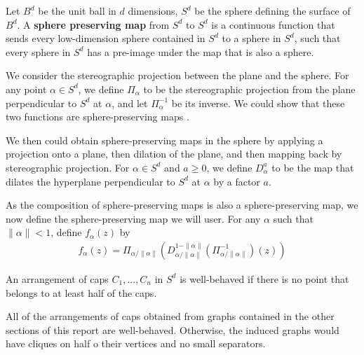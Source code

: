 
\begin{definition}
    Let $B^d$ be the unit ball in $d$ dimensions, $S^d$ be the sphere defining the surface of $B^d$.
    A \textbf{sphere preserving map} from $S^d$ to $S^d$ is a continuous function that sends every low-dimension sphere contained in $S^d$ to a sphere in $S^d$, such that every sphere in $S^d$ has a pre-image under the map that is also a sphere. 
\end{definition}
We consider the stereographic projection between the plane and the sphere. For any point $\alpha \in S^d$, we define $\Pi_\alpha$ to be the stereographic projection from the plane perpendicular to $S^d$ at $\alpha$, and let $\Pi_\alpha^{-1}$ be its inverse. We could show that these two functions are sphere-preserving maps \cite{HCV52}.

We then could obtain sphere-preserving maps in the sphere by applying a projection onto a plane, then dilation of the plane, and then mapping back by stereographic projection. For $\alpha \in S^d$ and $a \geq 0$, we define $D^a_\alpha$ to be the map that dilates the hyperplane perpendicular to $S^d$ at $\alpha$ by a factor $a$. 

As the composition of sphere-preserving maps is also a sphere-preserving map, we now define the sphere-preserving map we will user. For any $\alpha$ such that $\|\alpha\|<1$, define $f_\alpha(z)$ by 
\begin{align*}
    f_\alpha(z) = \Pi_{\alpha/\|\alpha\|}(D_{\alpha/\|\alpha\|}^{1-\|\alpha\|}(\Pi_{\alpha/\|\alpha\|}^{-1})(z))
\end{align*}






\begin{definition}
    An arrangement of caps ${C_1, ..., C_n}$ in $S^d$ is well-behaved if there is no point that belongs to at least half of the caps.     
\end{definition}
\begin{remark}
    All of the arrangements of caps obtained from graphs contained in the other sections of this report are well-behaved. Otherwise, the induced graphs would have cliques on half o their vertices and no small separators.
\end{remark}

